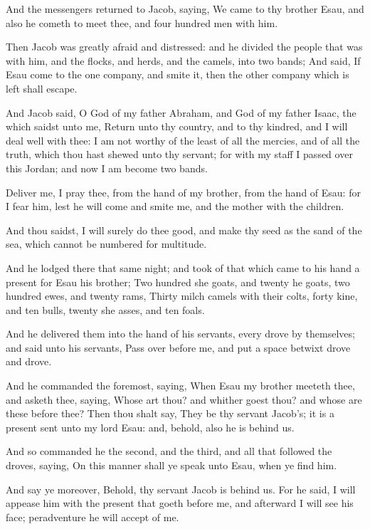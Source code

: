 \verse And the messengers returned to Jacob, saying, We came to thy brother Esau, and also he cometh to meet thee, and four hundred men with him.

\verse Then Jacob was greatly afraid and distressed: and he divided the people that was with him, and the flocks, and herds, and the camels, into two bands; \verse And said, If Esau come to the one company, and smite it, then the other company which is left shall escape.

\verse And Jacob said, O God of my father Abraham, and God of my father Isaac, the \LORD which saidst unto me, Return unto thy country, and to thy kindred, and I will deal well with thee: \verse I am not worthy of the least of all the mercies, and of all the truth, which thou hast shewed unto thy servant; for with my staff I passed over this Jordan; and now I am become two bands.

\verse Deliver me, I pray thee, from the hand of my brother, from the hand of Esau: for I fear him, lest he will come and smite me, and the mother with the children.

\verse And thou saidst, I will surely do thee good, and make thy seed as the sand of the sea, which cannot be numbered for multitude.

\verse And he lodged there that same night; and took of that which came to his hand a present for Esau his brother; \verse Two hundred she goats, and twenty he goats, two hundred ewes, and twenty rams, \verse Thirty milch camels with their colts, forty kine, and ten bulls, twenty she asses, and ten foals.

\verse And he delivered them into the hand of his servants, every drove by themselves; and said unto his servants, Pass over before me, and put a space betwixt drove and drove.

\verse And he commanded the foremost, saying, When Esau my brother meeteth thee, and asketh thee, saying, Whose art thou? and whither goest thou? and whose are these before thee?  \verse Then thou shalt say, They be thy servant Jacob's; it is a present sent unto my lord Esau: and, behold, also he is behind us.

\verse And so commanded he the second, and the third, and all that followed the droves, saying, On this manner shall ye speak unto Esau, when ye find him.

\verse And say ye moreover, Behold, thy servant Jacob is behind us. For he said, I will appease him with the present that goeth before me, and afterward I will see his face; peradventure he will accept of me.

